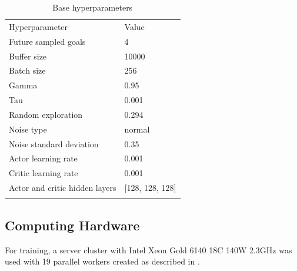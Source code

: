 \begin{table}
\begin{tabular}{ll}
\hline\noalign{\smallskip}
Hyperparameter  & Value \\
\noalign{\smallskip}\hline\noalign{\smallskip}
Future sampled goals & 4 \\
Buffer size & 10000 \\
Batch size & 256 \\
Gamma & 0.95 \\
Tau & 0.001 \\
Random exploration & 0.294 \\
Noise type & normal \\
Noise standard deviation & 0.35 \\
Actor learning rate & 0.001 \\
Critic learning rate & 0.001 \\
Actor and critic hidden layers & [128, 128, 128] \\
\noalign{\smallskip}\hline
\end{tabular}
\caption{Base hyperparameters}
\label{base-hyperparams} 
\end{table}

\subsection{Computing Hardware}
For training, a server cluster with Intel Xeon Gold 6140 18C 140W 2.3GHz was used with 19 parallel workers created as described in \cite{OpenAI2018}.


